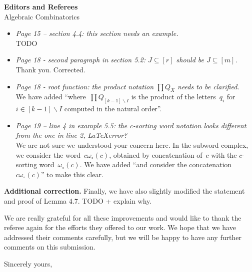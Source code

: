 \documentclass{letter}
\begin{document}
\begin{letter}{{\bf Editors and Referees} \\ Algebraic Combinatorics}
\begin{itemize}
\item \textsl{\color{gray} Page 15 -- section 4.4: this section needs an example.} \\
{\color{red} TODO}

\item \textsl{\color{gray} Page 18 - second paragraph in section 5.2: $J\subseteq [r]$ should be $J\subseteq [m]$.} \\
Thank you. Corrected.

\item \textsl{\color{gray} Page 18 - root function: the product notation $\prod Q_X$ needs to be clarified.} \\
We have added ``where~$\prod Q_{[k-1]\smallsetminus I}$ is the product of the letters~$q_i$ for~$i \in [k-1] \smallsetminus I$ computed in the natural order''.

\item \textsl{\color{gray} Page 19 -- line 4 in example 5.5: the c-sorting word notation looks different from the one in line 2, \LaTeX error?} \\
We are not sure we understood your concern here. In the subword complex, we consider the word~$c\omega_\circ(c)$, obtained by concatenation of~$c$ with the $c$-sorting word~$\omega_\circ(c)$. We have added ``and consider the concatenation~$c\omega_\circ(c)$'' to make this clear.

\end{itemize}

{\bf Additional correction.}
Finally, we have also slightly modified the statement and proof of Lemma 4.7.
{\color{red} TODO + explain why.}

We are really grateful for all these improvements and would like to thank the referee again for the efforts they offered to our work. We hope that we have addressed their comments carefully, but we will be happy to have any further comments on this submission.

%

\closing{Sincerely yours,}

\end{letter}
\end{document}
